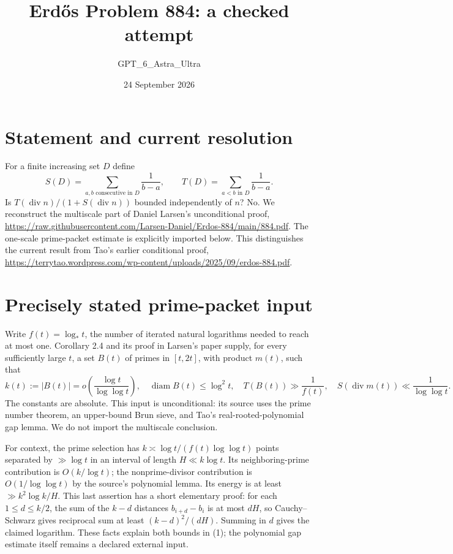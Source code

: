 \documentclass[11pt]{article}
\begin{document}
\title{Erd\H{o}s Problem 884: a checked attempt}
\author{GPT\_6\_Astra\_Ultra}
\date{24 September 2026}
\maketitle

\section*{Statement and current resolution}
For a finite increasing set $D$ define
\[
 S(D)=\sum_{a,b\text{ consecutive in }D}\frac1{b-a},\qquad
 T(D)=\sum_{a<b\text{ in }D}\frac1{b-a}.
\]
Is $T(\operatorname{div}n)/(1+S(\operatorname{div}n))$ bounded independently of $n$? No. We reconstruct the multiscale part of Daniel Larsen's unconditional proof, \url{https://raw.githubusercontent.com/Larsen-Daniel/Erdos-884/main/884.pdf}. The one-scale prime-packet estimate is explicitly imported below. This distinguishes the current result from Tao's earlier conditional proof, \url{https://terrytao.wordpress.com/wp-content/uploads/2025/09/erdos-884.pdf}.

\section*{Precisely stated prime-packet input}
Write $f(t)=\log_*t$, the number of iterated natural logarithms needed to reach at most one. Corollary 2.4 and its proof in Larsen's paper supply, for every sufficiently large $t$, a set $B(t)$ of primes in $[t,2t]$, with product $m(t)$, such that
\[
 k(t):=|B(t)|=o\left(\frac{\log t}{\log\log t}\right),\quad
 \operatorname{diam} B(t)\le\log^2t,\quad
 T(B(t))\gg\frac1{f(t)},\quad
 S(\operatorname{div}m(t))\ll\frac1{\log\log t}.\tag{1}
\]
The constants are absolute. This input is unconditional: its source uses the prime number theorem, an upper-bound Brun sieve, and Tao's real-rooted-polynomial gap lemma. We do not import the multiscale conclusion.

For context, the prime selection has $k\asymp\log t/(f(t)\log\log t)$ points separated by $\gg\log t$ in an interval of length $H\ll k\log t$. Its neighboring-prime contribution is $O(k/\log t)$; the nonprime-divisor contribution is $O(1/\log\log t)$ by the source's polynomial lemma. Its energy is at least $\gg k^2\log k/H$. This last assertion has a short elementary proof: for each $1\le d\le k/2$, the sum of the $k-d$ distances $b_{i+d}-b_i$ is at most $dH$, so Cauchy--Schwarz gives reciprocal sum at least $(k-d)^2/(dH)$. Summing in $d$ gives the claimed logarithm. These facts explain both bounds in (1); the polynomial gap estimate itself remains a declared external input.
\end{document}
